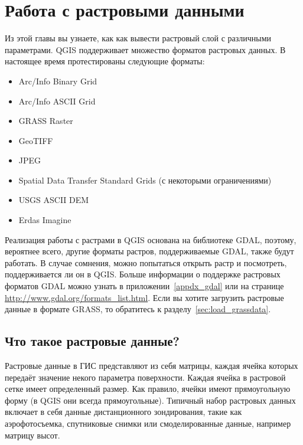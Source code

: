 
\chapter{Работа с растровыми данными}\label{label_raster}


Из этой главы вы узнаете, как как вывести растровый слой с различными параметрами.
QGIS поддерживает множество форматов растровых данных. В настоящее время
протестированы следующие форматы:

\begin{itemize}[label=--]
\item Arc/Info Binary Grid
\item Arc/Info ASCII Grid
\item GRASS Raster
\item GeoTIFF
\item JPEG
\item Spatial Data Transfer Standard Grids (с некоторыми ограничениями)
\item USGS ASCII DEM
\item Erdas Imagine
\end{itemize}

Реализация работы с растрами в QGIS основана на библиотеке GDAL, поэтому,
вероятнее всего, другие форматы растров, поддерживаемые GDAL, также будут работать.
В случае сомнения, можно попытаться открыть растр и посмотреть,
поддерживается ли он в QGIS. Больше информации о поддержке растровых
форматов GDAL можно узнать в приложении~\ref{appdx_gdal}
или на странице \url{http://www.gdal.org/formats_list.html}. Если вы хотите
загрузить растровые данные в формате GRASS, то обратитесь к
разделу~\ref{sec:load_grassdata}.

\section{Что такое растровые данные?}\label{label_whatsraster}

Растровые данные в ГИС представляют из себя матрицы, каждая ячейка которых
передаёт значение некого параметра поверхности. Каждая ячейка в
растровой сетке имеет определенный размер. Как правило, ячейки имеют
прямоугольную форму (в QGIS они всегда прямоугольные).  Типичный набор
растровых данных включает в себя данные дистанционного зондирования,
такие как аэрофотосъемка, спутниковые снимки или смоделированные данные,
например матрицу высот.

